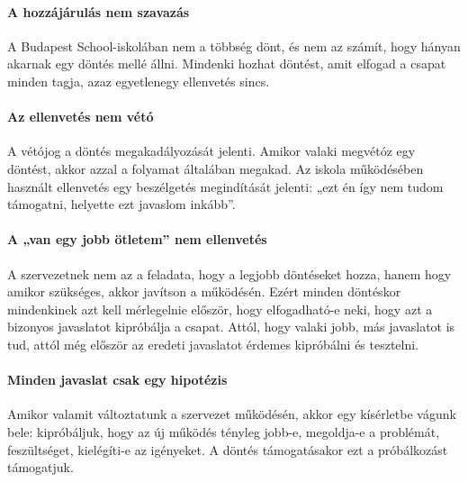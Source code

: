 \hypertarget{a-hozzajarulas-nem-szavazas}{%
\paragraph{A hozzájárulás nem
szavazás}\label{a-hozzajarulas-nem-szavazas}}

A Budapest School-iskolában nem a többség dönt, és nem az számít, hogy
hányan akarnak egy döntés mellé állni. Mindenki hozhat döntést, amit
elfogad a csapat minden tagja, azaz egyetlenegy ellenvetés sincs.

\hypertarget{az-ellenvetes-nem-veto}{%
\paragraph{Az ellenvetés nem vétó}\label{az-ellenvetes-nem-veto}}

A vétójog a döntés megakadályozását jelenti. Amikor valaki
megvétóz egy döntést, akkor azzal a folyamat általában megakad. Az
iskola működésében használt ellenvetés egy beszélgetés megindítását
jelenti: „ezt én így nem tudom támogatni, helyette ezt javaslom inkább''.

\hypertarget{a-van-egy-jobb-otletem-nem-ellenvetes}{%
\paragraph{A „van egy jobb ötletem'' nem
ellenvetés}\label{a-van-egy-jobb-otletem-nem-ellenvetes}}

A szervezetnek nem az a feladata, hogy a legjobb döntéseket hozza, hanem
hogy amikor szükséges, akkor javítson a működésén. Ezért minden
döntéskor mindenkinek azt kell mérlegelnie először, hogy elfogadható-e
neki, hogy azt a bizonyos javaslatot kipróbálja a csapat. Attól, hogy
valaki jobb, más javaslatot is tud, attól még először az eredeti
javaslatot érdemes kipróbálni és tesztelni.

\hypertarget{minden-javaslat-csak-egy-hipotezis}{%
\paragraph{Minden javaslat csak egy
hipotézis}\label{minden-javaslat-csak-egy-hipotezis}}

Amikor valamit változtatunk a szervezet működésén, akkor egy kísérletbe
vágunk bele: kipróbáljuk, hogy az új működés tényleg jobb-e, megoldja-e
a problémát, feszültséget, ki\-e\-lé\-gí\-ti-e az igényeket. A döntés
támogatásakor ezt a próbálkozást támogatjuk.


